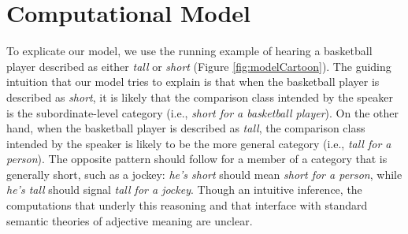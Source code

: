 \documentclass[doc]{apa6}
\begin{document}
%

\section{Computational Model}

To explicate our model, we use the running example of hearing a basketball player described as either \emph{tall} or \emph{short} (Figure \ref{fig:modelCartoon}). 
The guiding intuition that our model tries to explain is that when the basketball player is described as \emph{short}, it is likely that the comparison class intended by the speaker is the subordinate-level category (i.e., \emph{short for a basketball player}). 
On the other hand, when the basketball player is described as \emph{tall}, the comparison class intended by the speaker is likely to be the more general category (i.e., \emph{tall for a person}).
The opposite pattern should follow for a member of a category that is generally short, such as a jockey: \emph{he's short} should mean \emph{short for a person}, while \emph{he's tall} should signal \emph{tall for a jockey}.
Though an intuitive inference, the computations that underly this reasoning and that interface with standard semantic theories of adjective meaning are unclear.




\end{document}
